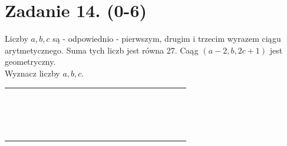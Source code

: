 \documentclass[10pt]{article}
\begin{document}
\section*{Zadanie 14. (0-6)}
Liczby \(a, b, c\) są - odpowiednio - pierwszym, drugim i trzecim wyrazem ciągu arytmetycznego. Suma tych liczb jest równa 27. Caąg \((a-2, b, 2 c+1)\) jest geometryczny.\\
Wyznacz liczby \(a, b, c\).

\begin{center}
\begin{tabular}{|c|c|c|c|c|c|c|c|c|c|c|c|c|c|c|c|c|c|c|c|c|c|}
\hline
 &  &  &  &  &  &  &  &  &  &  &  &  &  &  &  &  &  &  &  &  &  \\
\hline
 &  &  &  &  &  &  &  &  &  &  &  &  &  &  &  &  &  &  &  &  &  \\
\hline
 &  &  &  &  &  &  &  &  &  &  &  &  &  &  &  &  &  &  &  &  &  \\
\hline
 &  &  &  &  &  &  &  &  &  &  &  &  &  &  &  &  &  &  &  &  &  \\
\hline
 &  &  &  &  &  &  &  &  &  &  &  &  &  &  &  &  &  &  &  &  &  \\
\hline
 &  &  &  &  &  &  &  &  &  &  &  &  &  &  &  &  &  &  &  &  &  \\
\hline
 &  &  &  &  &  &  &  &  &  &  &  &  &  &  &  &  &  &  &  &  &  \\
\hline
 &  &  &  &  &  &  &  &  &  &  &  &  &  &  &  &  &  &  &  &  &  \\
\hline
 &  &  &  &  &  &  &  &  &  &  &  &  &  &  &  &  &  &  &  &  &  \\
\hline
 &  &  &  &  &  &  &  &  &  &  &  &  &  &  &  &  &  &  &  &  &  \\
\hline
 &  &  &  &  &  &  &  &  &  &  &  &  &  &  &  &  &  &  &  &  &  \\
\hline
 &  &  &  &  &  &  &  &  &  &  &  &  &  &  &  &  &  &  &  &  &  \\
\hline
 &  &  &  &  &  &  &  &  &  &  &  &  &  &  &  &  &  &  &  &  &  \\
\hline
 &  &  &  &  &  &  &  &  &  &  &  &  &  &  &  &  &  &  &  &  &  \\
\hline
 &  &  &  &  &  &  &  &  &  &  &  &  &  &  &  &  &  &  &  &  &  \\
\hline
 &  &  &  &  &  &  &  &  &  &  &  &  &  &  &  &  &  &  &  &  &  \\
\hline
 &  &  &  &  &  &  &  &  &  &  &  &  &  &  &  &  &  &  &  &  &  \\
\hline
 &  &  &  &  &  &  &  &  &  &  &  &  &  &  &  &  &  &  &  &  &  \\

\end{tabular}
\end{center}
\end{document}
